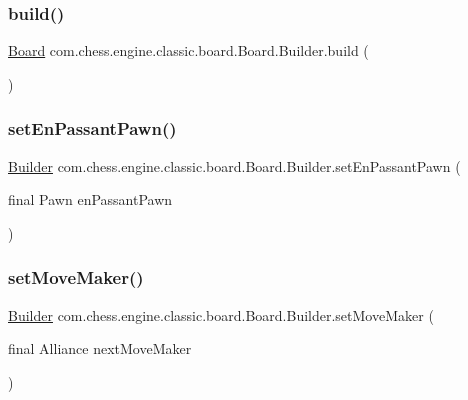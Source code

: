 \subsubsection{\texorpdfstring{build()}{build()}}
{\footnotesize\ttfamily \mbox{\hyperlink{classcom_1_1chess_1_1engine_1_1classic_1_1board_1_1_board}{Board}} com.\+chess.\+engine.\+classic.\+board.\+Board.\+Builder.\+build (\begin{DoxyParamCaption}{ }\end{DoxyParamCaption})}

\mbox{\label{classcom_1_1chess_1_1engine_1_1classic_1_1board_1_1_board_1_1_builder_a88b23347fd476e6806b77b5949c5f382}} 
\subsubsection{\texorpdfstring{setEnPassantPawn()}{setEnPassantPawn()}}
{\footnotesize\ttfamily \mbox{\hyperlink{classcom_1_1chess_1_1engine_1_1classic_1_1board_1_1_board_1_1_builder}{Builder}} com.\+chess.\+engine.\+classic.\+board.\+Board.\+Builder.\+set\+En\+Passant\+Pawn (\begin{DoxyParamCaption}\item[{final Pawn}]{en\+Passant\+Pawn }\end{DoxyParamCaption})}

\mbox{\label{classcom_1_1chess_1_1engine_1_1classic_1_1board_1_1_board_1_1_builder_ad7646b45a2ce8f1a4569aab6c587edad}} 
\subsubsection{\texorpdfstring{setMoveMaker()}{setMoveMaker()}}
{\footnotesize\ttfamily \mbox{\hyperlink{classcom_1_1chess_1_1engine_1_1classic_1_1board_1_1_board_1_1_builder}{Builder}} com.\+chess.\+engine.\+classic.\+board.\+Board.\+Builder.\+set\+Move\+Maker (\begin{DoxyParamCaption}\item[{final Alliance}]{next\+Move\+Maker }\end{DoxyParamCaption})}

